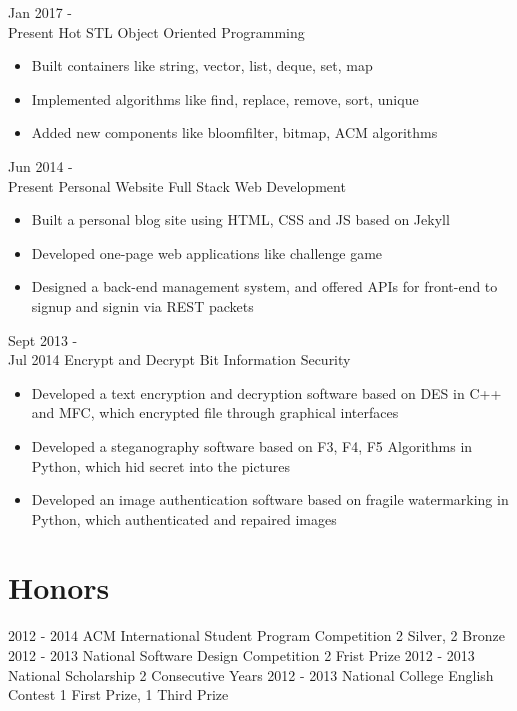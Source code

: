 \documentclass[letterpaper]{twentysecondcv} %
\begin{document}
\begin{twenty} %
	\twentyitem
	{Jan 2017 - \\Present}
	{Hot STL}
	{Object Oriented Programming}
	{}
	{
		{\begin{itemize}
				\item Built containers like string, vector, list, deque, set, map
				\item Implemented algorithms like find, replace, remove, sort, unique
				\item Added new components like bloomfilter, bitmap, ACM algorithms
		\end{itemize}}
	}

	\twentyitem
	{Jun 2014 - \\Present}
	{Personal Website}
	{Full Stack Web Development}
	{}
	{
		{\begin{itemize}
				\item Built a personal blog site using HTML, CSS and JS based on Jekyll
				\item Developed one-page web applications like challenge game
				\item Designed a back-end management system, and offered APIs for front-end to signup and signin via REST packets
		\end{itemize}}
	}

	\twentyitem
	{Sept 2013 - \\Jul 2014}
	{Encrypt and Decrypt Bit}
	{Information Security}
	{}
	{
		{\begin{itemize}
				\item Developed a text encryption and decryption software based on DES in C++ and MFC, which encrypted file through graphical interfaces
				\item Developed a steganography software based on F3, F4, F5 Algorithms in Python, which hid secret into the pictures
				\item Developed an image authentication software based on fragile watermarking in Python, which authenticated and repaired images
		\end{itemize}}
	}
	
\end{twenty}



\section{Honors}
\begin{twenty}
	\twentyitemthree
	{2012 - 2014}
	{ACM International Student Program Competition}
	{2 Silver, 2 Bronze}
	\twentyitemthree
	{2012 - 2013}
	{National Software Design Competition}
	{2 Frist Prize}
	\twentyitemthree
	{2012 - 2013}
	{National Scholarship}
	{2 Consecutive Years}
	\twentyitemthree
	{2012 - 2013}
	{National College English Contest}
	{1 First Prize, 1 Third Prize}
\end{twenty}
\end{document}
